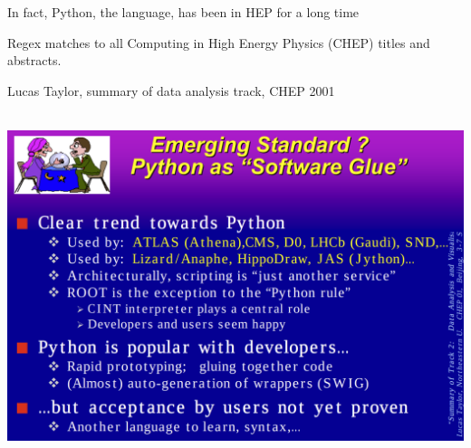 \documentclass[aspectratio=169]{beamer}
\begin{document}
\begin{frame}{In fact, Python, the language, has been in HEP for a long time}
\vspace{0.25 cm}

Regex matches to all Computing in High Energy Physics (CHEP) titles and abstracts.

\vspace{-0.1 cm}
\begin{center}
\end{center}
\end{frame}

\begin{frame}{Lucas Taylor, summary of data analysis track, CHEP 2001}
\vspace{0.25 cm}

\mbox{ } \hfill \includegraphics[width=0.82\linewidth]{PLOTS/chep-2001-python.png} \hfill \mbox{ }
\end{frame}
\end{document}

